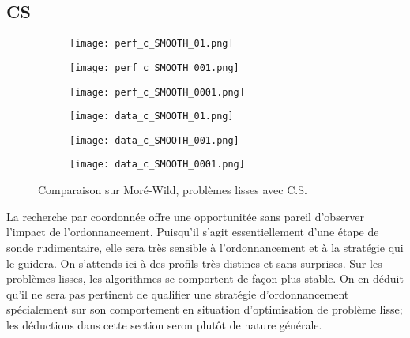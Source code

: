 \documentclass[letterpaper]{scrartcl}
\begin{document}
	\subsection{CS}
		\begin{figure}[!htb] %
			\begin{subfigure}{0.48\textwidth}
				\texttt{[image: perf\_c\_SMOOTH\_01.png]}
			\end{subfigure}\hspace*{\fill}
			\begin{subfigure}{0.48\textwidth}
				\texttt{[image: perf\_c\_SMOOTH\_001.png]}
			\end{subfigure}
			\medskip
			\begin{subfigure}{0.48\textwidth}
				\texttt{[image: perf\_c\_SMOOTH\_0001.png]}
			\end{subfigure}\hspace*{\fill}
			\begin{subfigure}{0.48\textwidth}
				\texttt{[image: data\_c\_SMOOTH\_01.png]}
			\end{subfigure}
			\medskip
			\begin{subfigure}{0.48\textwidth}
				\texttt{[image: data\_c\_SMOOTH\_001.png]}
			\end{subfigure}\hspace*{\fill}
			\begin{subfigure}{0.48\textwidth}
				\texttt{[image: data\_c\_SMOOTH\_0001.png]}
			\end{subfigure}
			\caption{Comparaison sur Moré-Wild, problèmes lisses avec C.S.} \label{fig:1}
		\end{figure}
		\clearpage
		La recherche par coordonnée offre une opportunitée sans pareil d'observer l'impact de l'ordonnancement. Puisqu'il s'agit essentiellement d'une étape de sonde rudimentaire, elle sera très sensible à l'ordonnancement et à la stratégie qui le guidera. On s'attends ici à des profils très distincs et sans surprises. Sur les problèmes lisses, les algorithmes se comportent de façon plus stable. On en déduit qu'il ne sera pas pertinent de qualifier une stratégie d'ordonnancement spécialement sur son comportement en situation d'optimisation de problème lisse; les déductions dans cette section seron plutôt de nature générale. \\
\end{document}
